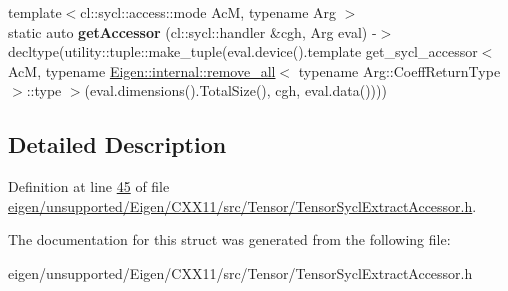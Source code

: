 \begin{DoxyCompactItemize}
\item 
\mbox{\label{struct_eigen_1_1_tensor_sycl_1_1internal_1_1_accessor_constructor_a7f94ccf32448b107bd46bd2dfc40f2bc}} 
{\footnotesize template$<$cl\+::sycl\+::access\+::mode AcM, typename Arg $>$ }\\static auto {\bfseries get\+Accessor} (cl\+::sycl\+::handler \&cgh, Arg eval) -\/$>$ decltype(utility\+::tuple\+::make\+\_\+tuple(eval.\+device().template get\+\_\+sycl\+\_\+accessor$<$ AcM, typename \hyperlink{struct_eigen_1_1internal_1_1remove__all}{Eigen\+::internal\+::remove\+\_\+all}$<$ typename Arg\+::\+Coeff\+Return\+Type $>$\+::type $>$(eval.\+dimensions().Total\+Size(), cgh, eval.\+data())))
\end{DoxyCompactItemize}


\subsection{Detailed Description}


Definition at line \hyperlink{eigen_2unsupported_2_eigen_2_c_x_x11_2src_2_tensor_2_tensor_sycl_extract_accessor_8h_source_l00045}{45} of file \hyperlink{eigen_2unsupported_2_eigen_2_c_x_x11_2src_2_tensor_2_tensor_sycl_extract_accessor_8h_source}{eigen/unsupported/\+Eigen/\+C\+X\+X11/src/\+Tensor/\+Tensor\+Sycl\+Extract\+Accessor.\+h}.



The documentation for this struct was generated from the following file\+:\begin{DoxyCompactItemize}
\item 
eigen/unsupported/\+Eigen/\+C\+X\+X11/src/\+Tensor/\+Tensor\+Sycl\+Extract\+Accessor.\+h\end{DoxyCompactItemize}
